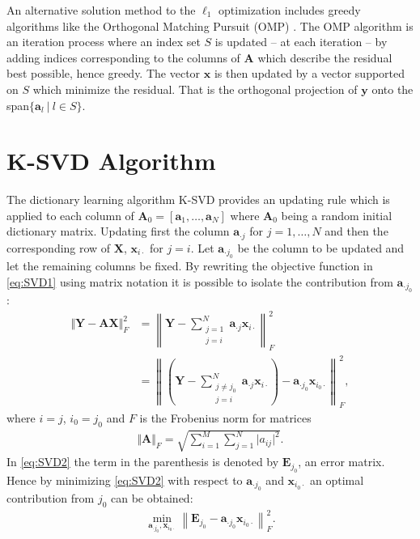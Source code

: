 An alternative solution method to the $\ell_1$ optimization includes greedy algorithms like the Orthogonal Matching Pursuit (OMP) \cite[P. 65]{FR}. 
The OMP algorithm is an iteration process where an index set $S$ is updated -- at each iteration -- by adding indices corresponding to the columns of $\mathbf{A}$ which describe the residual best possible, hence greedy.
The vector $\mathbf{x}$ is then updated by a vector supported on $S$ which minimize the residual. That is the orthogonal projection of $\mathbf{y}$ onto the span$\lbrace \mathbf{a}_l \ \vert \ l \in S \rbrace$.

\section{K-SVD Algorithm}\label{app_sec:K-SVD_alg}
The dictionary learning algorithm K-SVD provides an updating rule which is applied to each column of $\mathbf{A}_0 = \left[ \mathbf{a}_1, \dots, \mathbf{a}_N \right] $ where $\mathbf{A}_0$ being a random initial dictionary matrix. Updating first the column $\mathbf{a}_{\cdot j}$ for $j=1, \dots, N$ and then the corresponding row of $\mathbf{X}$, $\mathbf{x}_{i\cdot}$ for $j=i$.
Let $\mathbf{a}_{\cdot j_{0}}$ be the column to be updated and let the remaining columns be fixed. By rewriting the objective function in \eqref{eq:SVD1} using matrix notation it is possible to isolate the contribution from $\mathbf{a}_{\cdot j_{0}}$:
\begin{align}\label{eq:SVD2} 
\Vert \mathbf{Y} - \mathbf{AX} \Vert_{F}^{2} 
&= \left\| \mathbf{Y} - \sum_{\substack{j=1 \\ j = i}}^{N} \mathbf{a}_{\cdot j} \mathbf{x}_{i \cdot} \right\|_{F}^{2} \nonumber \\
&= \left\| \left( \mathbf{Y}- \sum_{\substack{j \neq j_0 \\ j = i}}^{N} \mathbf{a}_{\cdot j} \mathbf{x}_{i \cdot} \right) - \mathbf{a}_{\cdot j_{0}} \mathbf{x}_{i_0 \cdot} \right\| _{F}^{2},
\end{align}
where $i = j$, $i_0 = j_0$ and $F$ is the Frobenius norm for matrices
\begin{align*}
\Vert \mathbf{A} \Vert_F = \sqrt{\sum_{i=1}^M \sum_{j=1}^N \vert a_{ij} \vert^2}.
\end{align*} 
In \eqref{eq:SVD2} the term in the parenthesis is denoted by $\mathbf{E}_{j_0}$, an error matrix. 
Hence by minimizing \eqref{eq:SVD2} with respect to $\mathbf{a}_{\cdot j_0}$ and $\mathbf{x}_{i_0 \cdot}$ an optimal contribution from $j_0$ can be obtained:
\begin{align}\label{eq:SVD3}
\min_{\mathbf{a}_{\cdot j_{0}}, \mathbf{x}_{i_0 \cdot}}\left\|\mathbf{E}_{j_{0}} - \mathbf{a}_{\cdot j_{0}} \mathbf{x}_{i_0 \cdot} \right\|_{F}^{2}.
\end{align} 

